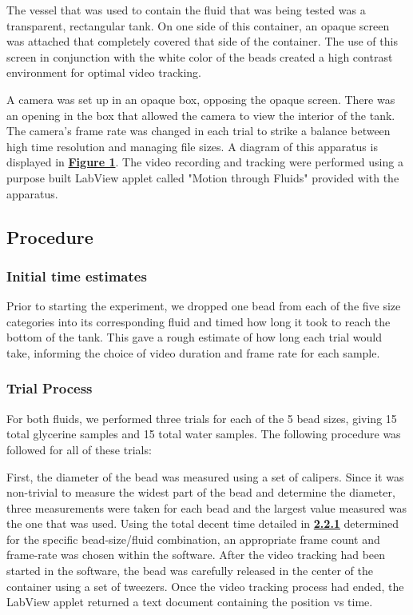 \documentclass[
	letterpaper
	12pt
]{template}
\newcommand{\bref}[2]{\textbf{\hyperref[#1]{#2}}}
\begin{document}
The vessel that was used to contain the fluid that was being tested was a transparent, rectangular tank. On one side of this container, an opaque screen was attached that completely covered that side of the container. The use of this screen in conjunction with the white color of the beads created a high contrast environment for optimal video tracking. \vspace{\baselineskip}

A camera was set up in an opaque box, opposing the opaque screen. There was an opening in the box that allowed the camera to view the interior of the tank. The camera's frame rate was changed in each trial to strike a balance between high time resolution and managing file sizes. A diagram of this apparatus is displayed in \bref{fig::apparatus}{Figure 1}. The video recording and tracking were performed using a purpose built LabView applet called "Motion through Fluids" provided with the apparatus.
\subsection{Procedure}
\subsubsection{Initial time estimates}\label{sec::timeEst}
Prior to starting the experiment, we dropped one bead from each of the five size categories into its corresponding fluid and timed how long it took to reach the bottom of the tank. This gave a rough estimate of how long each trial would take, informing the choice of video duration and frame rate for each sample.
\subsubsection{Trial Process}
For both fluids, we performed three trials for each of the 5 bead sizes, giving 15 total glycerine samples and 15 total water samples. The following procedure was followed for all of these trials: \vspace{\baselineskip}

First, the diameter of the bead was measured using a set of calipers. Since it was non-trivial to measure the widest part of the bead and determine the diameter, three measurements were taken for each bead and the largest value measured was the one that was used. Using the total decent time detailed in \bref{sec::timeEst}{2.2.1} determined for the specific bead-size/fluid combination, an appropriate frame count and frame-rate was chosen within the software. After the video tracking had been started in the software, the bead was carefully released in the center of the container using a set of tweezers. Once the video tracking process had ended, the LabView applet returned a text document containing the position vs time.
\vspace{\baselineskip}
\end{document}
